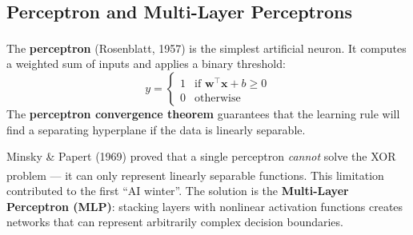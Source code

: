 \subsection{Perceptron and Multi-Layer Perceptrons}

\begin{tcbitemize}[ skin=sectionraster ]
    \tcbitem[title={The Perceptron}, raster multicolumn=3]
    The \textbf{perceptron} (Rosenblatt, 1957) is the simplest artificial neuron\textsuperscript{\cite[][pp.~57--62]{Kriesel2007NeuralNetworks}}.
    It computes a weighted sum of inputs and applies a binary threshold:
    \begin{equation}
        y = \begin{cases} 1 & \text{if } \mathbf{w}^\top \mathbf{x} + b \geq 0 \\ 0 & \text{otherwise} \end{cases}
    \end{equation}
    The \textbf{perceptron convergence theorem} guarantees that the learning rule will find a separating hyperplane if the data is linearly separable.

    \tcbitem[title={The XOR Problem and MLPs}, raster multicolumn=3]
    Minsky \& Papert (1969) proved that a single perceptron \emph{cannot} solve the XOR problem --- it can only represent linearly separable functions\textsuperscript{\cite[][pp.~63--65]{Kriesel2007NeuralNetworks}}.
    This limitation contributed to the first ``AI winter''.
    The solution is the \textbf{Multi-Layer Perceptron (MLP)}: stacking layers with nonlinear activation functions creates networks that can represent arbitrarily complex decision boundaries.
    \tcblower
    \begin{center}
\end{center}
\end{tcbitemize}
